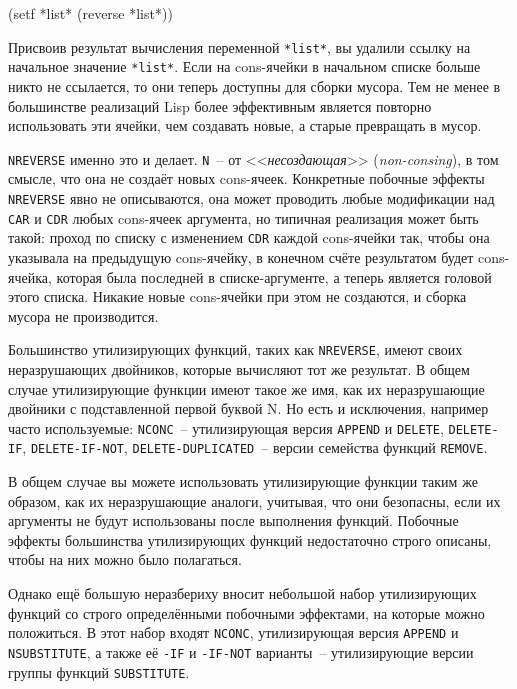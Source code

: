 \begin{myverb}
(setf *list* (reverse *list*))
\end{myverb}

Присвоив результат вычисления переменной \lstinline{*list*}, вы удалили ссылку на начальное
значение \lstinline{*list*}. Если на cons-ячейки в начальном списке больше никто не ссылается,
то они теперь доступны для сборки мусора. Тем не менее в большинстве реализаций Lisp более
эффективным является повторно использовать эти ячейки, чем создавать новые, а старые
превращать в мусор.

\lstinline{NREVERSE} именно это и делает. \lstinline{N}~-- от <<\textit{несоздающая}>> (\textit{non-consing}),
в том смысле, что она не создаёт новых cons-ячеек. Конкретные побочные эффекты \lstinline{NREVERSE}
явно не описываются, она может проводить любые модификации над \lstinline{CAR} и \lstinline{CDR}
любых cons-ячеек аргумента, но типичная реализация может быть такой: проход по списку с
изменением \lstinline{CDR} каждой cons-ячейки так, чтобы она указывала на предыдущую
cons-ячейку, в конечном счёте результатом будет cons-ячейка, которая была последней в
списке-аргументе, а теперь является головой этого списка. Никакие новые cons-ячейки при
этом не создаются, и сборка мусора не производится.

Большинство утилизирующих функций, таких как \lstinline{NREVERSE}, имеют своих неразрушающих
двойников, которые вычисляют тот же результат. В общем случае утилизирующие функции имеют
такое же имя, как их неразрушающие двойники с подставленной первой буквой N. Но есть и
исключения, например часто используемые: \lstinline{NCONC}~-- утилизирующая версия
\lstinline{APPEND} и \lstinline{DELETE}, \lstinline{DELETE-IF}, \lstinline{DELETE-IF-NOT},
\lstinline{DELETE-DUPLICATED}~-- версии семейства функций \lstinline{REMOVE}.

В общем случае вы можете использовать утилизирующие функции таким же образом, как их
неразрушающие аналоги, учитывая, что они безопасны, если их аргументы не будут
использованы после выполнения функций. Побочные эффекты большинства утилизирующих функций
недостаточно строго описаны, чтобы на них можно было полагаться.

Однако ещё большую неразбериху вносит небольшой набор утилизирующих функций со строго
определёнными побочными эффектами, на которые можно положиться. В этот набор входят
\lstinline{NCONC}, утилизирующая версия \lstinline{APPEND} и \lstinline{NSUBSTITUTE}, а также её \lstinline{-IF} и
\lstinline{-IF-NOT} варианты~-- утилизирующие версии группы функций \lstinline{SUBSTITUTE}.

